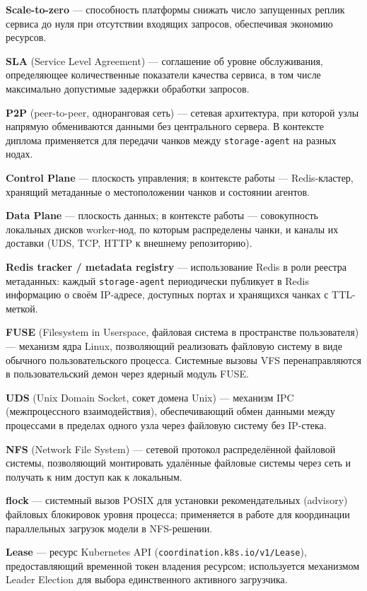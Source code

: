 \textbf{Scale-to-zero} --- способность платформы снижать число запущенных реплик сервиса до нуля при отсутствии входящих запросов, обеспечивая экономию ресурсов.

\textbf{SLA} (Service Level Agreement) --- соглашение об уровне обслуживания, определяющее количественные показатели качества сервиса, в том числе максимально допустимые задержки обработки запросов.

\textbf{P2P} (peer-to-peer, одноранговая сеть) --- сетевая архитектура, при которой узлы напрямую обмениваются данными без центрального сервера. В контексте диплома применяется для передачи чанков между \texttt{storage-agent} на разных нодах.

\textbf{Control Plane} --- плоскость управления; в контексте работы --- Redis-кластер, хранящий метаданные о местоположении чанков и состоянии агентов.

\textbf{Data Plane} --- плоскость данных; в контексте работы --- совокупность локальных дисков worker-нод, по которым распределены чанки, и каналы их доставки (UDS, TCP, HTTP к внешнему репозиторию).

\textbf{Redis tracker / metadata registry} --- использование Redis в роли реестра метаданных: каждый \texttt{storage-agent} периодически публикует в Redis информацию о своём IP-адресе, доступных портах и хранящихся чанках с TTL-меткой.

\textbf{FUSE} (Filesystem in Userspace, файловая система в пространстве пользователя) --- механизм ядра Linux, позволяющий реализовать файловую систему в виде обычного пользовательского процесса. Системные вызовы VFS перенаправляются в пользовательский демон через ядерный модуль FUSE.

\textbf{UDS} (Unix Domain Socket, сокет домена Unix) --- механизм IPC (межпроцессного взаимодействия), обеспечивающий обмен данными между процессами в пределах одного узла через файловую систему без IP-стека.

\textbf{NFS} (Network File System) --- сетевой протокол распределённой файловой системы, позволяющий монтировать удалённые файловые системы через сеть и получать к ним доступ как к локальным.

\textbf{flock} --- системный вызов POSIX для установки рекомендательных (advisory) файловых блокировок уровня процесса; применяется в работе для координации параллельных загрузок модели в NFS-решении.

\textbf{Lease} --- ресурс Kubernetes API (\texttt{coordination.k8s.io/v1/Lease}), предоставляющий временной токен владения ресурсом; используется механизмом Leader Election для выбора единственного активного загрузчика.

